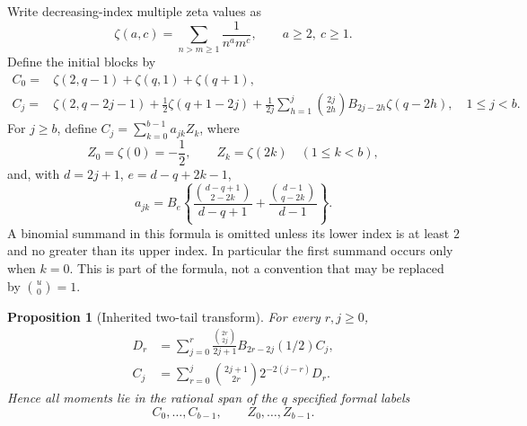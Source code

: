 \documentclass[11pt,a4paper]{article}
\numberwithin{equation}{section}
\theoremstyle{plain}
\newtheorem{proposition}[theorem]{Proposition}
\theoremstyle{definition}
\theoremstyle{remark}
\begin{document}
Write decreasing-index multiple zeta values as
\[
 \zeta(a,c)=\sum_{n>m\ge1}\frac1{n^a m^c},\qquad a\ge2,\ c\ge1.
\]
Define the initial blocks by
\begin{align}
 C_0={}&\zeta(2,q-1)+\zeta(q,1)+\zeta(q+1),
 \label{eq:C0-foundation}\\
 C_j={}&\zeta(2,q-2j-1)+\frac12\zeta(q+1-2j)
   +\frac1{2j}\sum_{h=1}^{j}\binom{2j}{2h}
                  B_{2j-2h}\zeta(q-2h),
 \quad 1\le j<b.\label{eq:Cinitial-foundation}
\end{align}
For $j\ge b$, define $C_j=\sum_{k=0}^{b-1}a_{jk}Z_k$, where
\begin{equation}\label{eq:coordinates-foundation}
 Z_0=\zeta(0)=-\frac12,\qquad Z_k=\zeta(2k)\quad(1\le k<b),
\end{equation}
and, with $d=2j+1$, $e=d-q+2k-1$,
\begin{equation}\label{eq:entries-foundation}
 a_{jk}=B_e\left\{
 \frac{\binom{d-q+1}{2-2k}}{d-q+1}
 +\frac{\binom{d-1}{q-2k}}{d-1}\right\}.
\end{equation}
A binomial summand in this formula is omitted unless its lower
index is at least $2$ and no greater than its upper index.
In particular the first summand occurs only when $k=0$.
This is part of the formula, not a convention that may be replaced
by $\binom u0=1$.

\begin{proposition}[Inherited two-tail transform]
\label{prop:tail-transform}
For every $r,j\ge0$,
\begin{align}
 D_r&=\sum_{j=0}^r
       \frac{\binom{2r}{2j}}{2j+1}B_{2r-2j}(1/2)C_j,
       \label{eq:forward-foundation}\\
 C_j&=\sum_{r=0}^j
       \binom{2j+1}{2r}2^{-2(j-r)}D_r.
       \label{eq:inverse-foundation}
\end{align}
Hence all moments lie in the rational span of the $q$ specified
formal labels
\[
 C_0,\ldots,C_{b-1},\qquad Z_0,\ldots,Z_{b-1}.
\]
\end{proposition}
\end{document}
